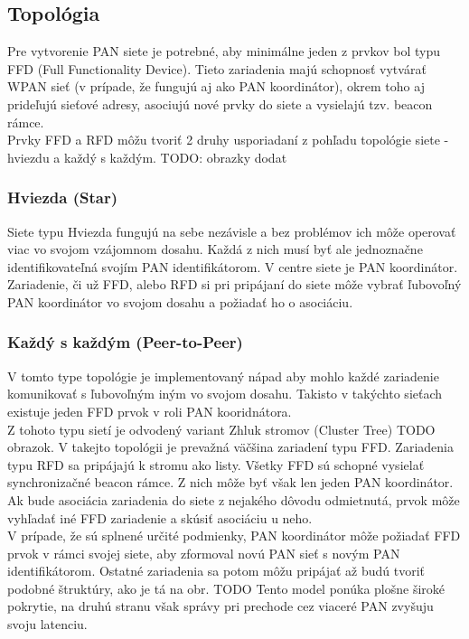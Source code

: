 \subsection{Topológia}

\indent\indent Pre vytvorenie PAN siete je potrebné, aby minimálne jeden z prvkov bol typu FFD (Full Functionality Device). Tieto zariadenia majú schopnosť vytvárať WPAN sieť (v prípade, že fungujú aj ako PAN koordinátor), okrem toho aj prideľujú sieťové adresy, asociujú nové prvky do siete a vysielajú tzv. beacon rámce.\\
\indent Prvky FFD a RFD môžu tvoriť 2 druhy usporiadaní z pohľadu topológie siete - hviezdu a každý s každým. TODO: obrazky dodat

\subsubsection{Hviezda (Star)}
\indent\indent Siete typu Hviezda fungujú na sebe nezávisle a bez problémov ich môže operovať viac vo svojom vzájomnom dosahu. Každá z nich musí byť ale jednoznačne identifikovateľná svojím PAN identifikátorom. V centre siete je PAN koordinátor. Zariadenie, či už FFD, alebo RFD si pri pripájaní do siete môže vybrať ľubovoľný PAN koordinátor vo svojom dosahu a požiadať ho o asociáciu.\\
\subsubsection{Každý s každým (Peer-to-Peer)}
\indent\indent V tomto type topológie je implementovaný nápad aby mohlo každé zariadenie komunikovať s ľubovoľným iným vo svojom dosahu. Takisto v takýchto sieťach existuje jeden FFD prvok v roli PAN kooridnátora.\\
\indent Z tohoto typu sietí je odvodený variant Zhluk stromov (Cluster Tree) TODO obrazok. V takejto topológii je prevažná väčšina zariadení typu FFD. Zariadenia typu RFD sa pripájajú k stromu ako listy. Všetky FFD sú schopné vysielať synchronizačné beacon rámce. Z nich môže byť však len jeden PAN koordinátor. Ak bude asociácia zariadenia do siete z nejakého dôvodu odmietnutá, prvok môže vyhľadať iné FFD zariadenie a skúsiť asociáciu u neho.\\
\indent V prípade, že sú splnené určité podmienky, PAN koordinátor môže požiadať FFD prvok v rámci svojej siete, aby  zformoval novú PAN sieť s novým PAN identifikátorom. Ostatné zariadenia sa potom môžu pripájať až budú tvoriť podobné štruktúry, ako je tá na obr. TODO Tento model ponúka plošne široké pokrytie, na druhú stranu však správy pri prechode cez viaceré PAN zvyšuju svoju latenciu.\\

